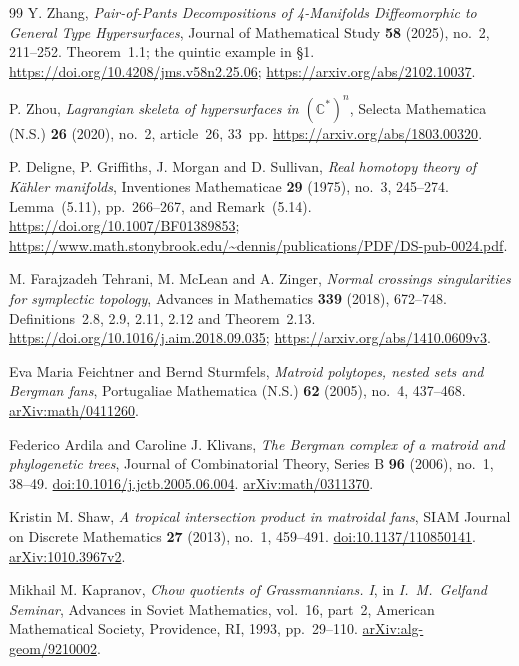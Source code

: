 \begin{thebibliography}{99}
Y. Zhang,
\emph{Pair-of-Pants Decompositions of 4-Manifolds Diffeomorphic to General Type Hypersurfaces},
Journal of Mathematical Study \textbf{58} (2025), no.~2, 211--252.
Theorem~1.1; the quintic example in \S1.
\url{https://doi.org/10.4208/jms.v58n2.25.06};
\url{https://arxiv.org/abs/2102.10037}.

P. Zhou,
\emph{Lagrangian skeleta of hypersurfaces in $(\mathbb C^*)^n$},
Selecta Mathematica (N.S.) \textbf{26} (2020), no.~2, article~26, 33~pp.
\url{https://arxiv.org/abs/1803.00320}.


P. Deligne, P. Griffiths, J. Morgan and D. Sullivan,
\emph{Real homotopy theory of K\"ahler manifolds},
Inventiones Mathematicae \textbf{29} (1975), no.~3, 245--274.
Lemma~(5.11), pp.~266--267, and Remark~(5.14).
\url{https://doi.org/10.1007/BF01389853};
\url{https://www.math.stonybrook.edu/~dennis/publications/PDF/DS-pub-0024.pdf}.

M. Farajzadeh Tehrani, M. McLean and A. Zinger,
\emph{Normal crossings singularities for symplectic topology},
Advances in Mathematics \textbf{339} (2018), 672--748.
Definitions~2.8, 2.9, 2.11, 2.12 and Theorem~2.13.
\url{https://doi.org/10.1016/j.aim.2018.09.035};
\url{https://arxiv.org/abs/1410.0609v3}.

Eva Maria Feichtner and Bernd Sturmfels,
\emph{Matroid polytopes, nested sets and Bergman fans},
Portugaliae Mathematica (N.S.) \textbf{62} (2005), no.~4, 437--468.
\href{https://arxiv.org/abs/math/0411260}{arXiv:math/0411260}.

Federico Ardila and Caroline J. Klivans,
\emph{The Bergman complex of a matroid and phylogenetic trees},
Journal of Combinatorial Theory, Series B \textbf{96} (2006), no.~1, 38--49.
\href{https://doi.org/10.1016/j.jctb.2005.06.004}{doi:10.1016/j.jctb.2005.06.004}.
\href{https://arxiv.org/abs/math/0311370}{arXiv:math/0311370}.

Kristin M. Shaw,
\emph{A tropical intersection product in matroidal fans},
SIAM Journal on Discrete Mathematics \textbf{27} (2013), no.~1, 459--491.
\href{https://doi.org/10.1137/110850141}{doi:10.1137/110850141}.
\href{https://arxiv.org/abs/1010.3967v2}{arXiv:1010.3967v2}.

Mikhail M. Kapranov,
\emph{Chow quotients of Grassmannians. I},
in \emph{I.~M.~Gelfand Seminar},
Advances in Soviet Mathematics, vol.~16, part~2,
American Mathematical Society, Providence, RI, 1993, pp.~29--110.
\href{https://arxiv.org/abs/alg-geom/9210002}{arXiv:alg-geom/9210002}.


\end{thebibliography}
